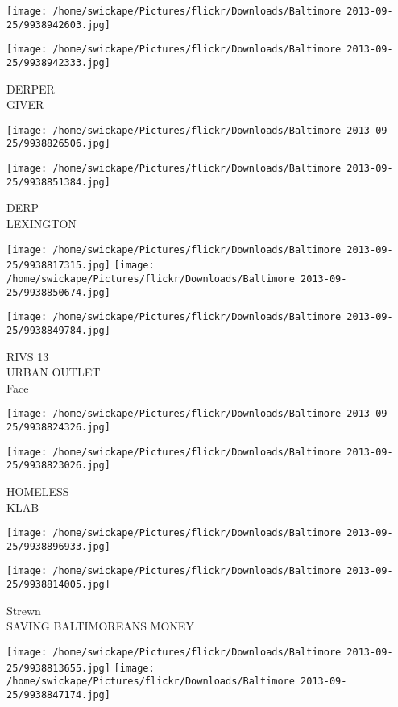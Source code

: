 \documentclass[10pt,letterpaper]{article}
\begin{document}
\texttt{[image: /home/swickape/Pictures/flickr/Downloads/Baltimore 2013-09-25/9938942603.jpg]}

\vspace{0.25in}
\texttt{[image: /home/swickape/Pictures/flickr/Downloads/Baltimore 2013-09-25/9938942333.jpg]}

DERPER\\
GIVER
\pagebreak

\texttt{[image: /home/swickape/Pictures/flickr/Downloads/Baltimore 2013-09-25/9938826506.jpg]}

\vspace{0.25in}
\texttt{[image: /home/swickape/Pictures/flickr/Downloads/Baltimore 2013-09-25/9938851384.jpg]}

DERP\\
LEXINGTON
\pagebreak

\texttt{[image: /home/swickape/Pictures/flickr/Downloads/Baltimore 2013-09-25/9938817315.jpg]}
\texttt{[image: /home/swickape/Pictures/flickr/Downloads/Baltimore 2013-09-25/9938850674.jpg]}

\vspace{0.25in}
\texttt{[image: /home/swickape/Pictures/flickr/Downloads/Baltimore 2013-09-25/9938849784.jpg]}

RIVS 13\\
URBAN OUTLET\\
Face
\pagebreak

\texttt{[image: /home/swickape/Pictures/flickr/Downloads/Baltimore 2013-09-25/9938824326.jpg]}

\vspace{0.25in}
\texttt{[image: /home/swickape/Pictures/flickr/Downloads/Baltimore 2013-09-25/9938823026.jpg]}

HOMELESS\\
KLAB
\pagebreak

\texttt{[image: /home/swickape/Pictures/flickr/Downloads/Baltimore 2013-09-25/9938896933.jpg]}

\vspace{0.25in}
\texttt{[image: /home/swickape/Pictures/flickr/Downloads/Baltimore 2013-09-25/9938814005.jpg]}

Strewn\\
SAVING BALTIMOREANS MONEY
\pagebreak

\texttt{[image: /home/swickape/Pictures/flickr/Downloads/Baltimore 2013-09-25/9938813655.jpg]}
\texttt{[image: /home/swickape/Pictures/flickr/Downloads/Baltimore 2013-09-25/9938847174.jpg]}
\end{document}
